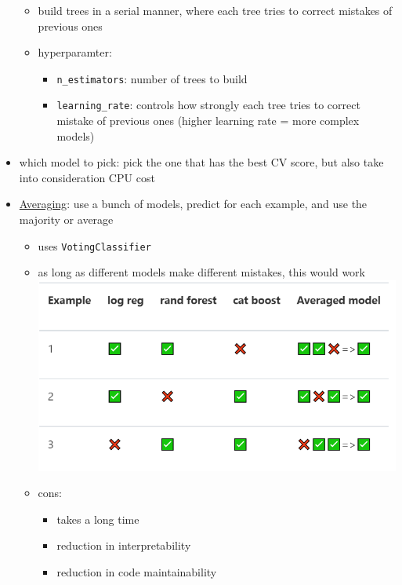 \documentclass[10.5pt,a4paper, fleqn, dvipsnames]{article}
\begin{document}
\begin{itemize}
\begin{itemize}
        \item build trees in a serial manner, where each tree tries to correct mistakes of previous ones
        \item hyperparamter:
        \begin{itemize}[leftmargin = 2em]
            \item \lstinline{n_estimators}: number of trees to build
            \item \lstinline{learning_rate}: controls how strongly each tree tries to correct mistake of previous ones (higher learning rate = more complex models)
        \end{itemize}
    \end{itemize}
    \item which model to pick: pick the one that has the best CV score, but also take into consideration CPU cost
    \item \ul{Averaging}: use a bunch of models, predict for each example, and use the majority or average 
    \begin{itemize}
        \item uses \lstinline{VotingClassifier}
        \item as long as different models make different mistakes, this would work \\
        \includegraphics[scale = 0.52]{averaging-example.png}
        \item cons: 
        \begin{itemize}[leftmargin = 2em]
            \item takes a long time
            \item reduction in interpretability
            \item reduction in code maintainability 
        \end{itemize}
    \end{itemize}

\end{itemize}
\end{document}
